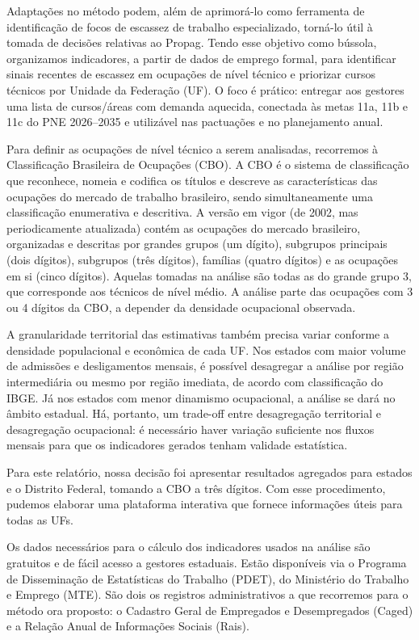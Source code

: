 Adaptações no método podem, além de aprimorá-lo como ferramenta de identificação de focos de escassez de trabalho especializado, torná-lo útil à tomada de decisões relativas ao Propag. Tendo esse objetivo como bússola, organizamos indicadores, a partir de dados de emprego formal, para identificar sinais recentes de escassez em ocupações de nível técnico e priorizar cursos técnicos por Unidade da Federação (UF). O foco é prático: entregar aos gestores uma lista de cursos/áreas com demanda aquecida, conectada às metas 11a, 11b e 11c do PNE 2026–2035 e utilizável nas pactuações e no planejamento anual.

Para definir as ocupações de nível técnico a serem analisadas, recorremos à Classificação Brasileira de Ocupações (CBO). A CBO é o sistema de classificação que reconhece, nomeia e codifica os títulos e descreve as características das ocupações do mercado de trabalho brasileiro, sendo simultaneamente uma classificação enumerativa e descritiva. A versão em vigor (de 2002, mas periodicamente atualizada) contém as ocupações do mercado brasileiro, organizadas e descritas por grandes grupos (um dígito), subgrupos principais (dois dígitos), subgrupos (três dígitos), famílias (quatro dígitos) e as ocupações em si (cinco dígitos). Aquelas tomadas na análise são todas as do grande grupo 3, que corresponde aos técnicos de nível médio. A análise parte das ocupações com 3 ou 4 dígitos da CBO, a depender da densidade ocupacional observada.

A granularidade territorial das estimativas também precisa variar conforme a densidade populacional e econômica de cada UF. Nos estados com maior volume de admissões e desligamentos mensais, é possível desagregar a análise por região intermediária ou mesmo por região imediata, de acordo com classificação do IBGE. Já nos estados com menor dinamismo ocupacional, a análise se dará no âmbito estadual. Há, portanto, um trade-off entre desagregação territorial e desagregação ocupacional: é necessário haver variação suficiente nos fluxos mensais para que os indicadores gerados tenham validade estatística.

Para este relatório, nossa decisão foi apresentar resultados agregados para estados e o Distrito Federal, tomando a CBO a três dígitos. Com esse procedimento, pudemos elaborar uma plataforma interativa que fornece informações úteis para todas as UFs. 

Os dados necessários para o cálculo dos indicadores usados na análise são gratuitos e de fácil acesso a gestores estaduais. Estão disponíveis via o Programa de Disseminação de Estatísticas do Trabalho (PDET), do Ministério do Trabalho e Emprego (MTE). São dois os registros administrativos a que recorremos para o método ora proposto: o Cadastro Geral de Empregados e Desempregados (Caged) e a Relação Anual de Informações Sociais (Rais). 

